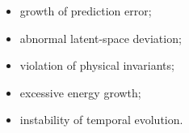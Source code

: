 \begin{itemize} \item growth of prediction error; \item abnormal latent-space deviation; \item violation of physical invariants; \item excessive energy growth; \item instability of temporal evolution. \end{itemize} %